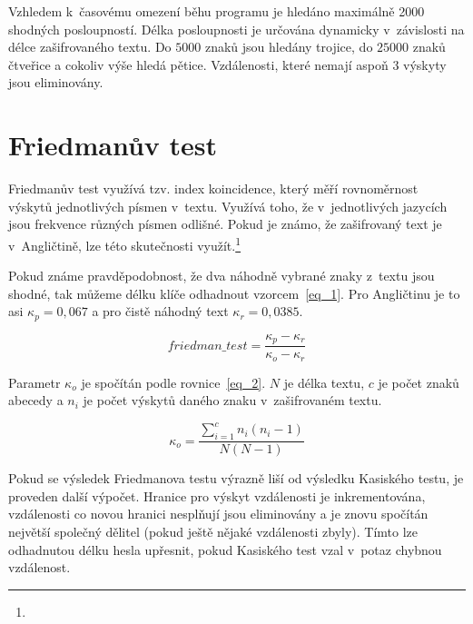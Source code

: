 \documentclass[11pt, a4paper, titlepage]{article}
\begin{document}
Vzhledem k~časovému omezení běhu programu je hledáno maximálně 2000 shodných posloupností.
Délka posloupnosti je určována dynamicky v~závislosti na délce zašifrovaného textu.
Do $5 000$ znaků jsou hledány trojice, do $25 000$ znaků čtveřice a cokoliv výše hledá pětice.
Vzdálenosti, které nemají aspoň $3$ výskyty jsou eliminovány.


\section{Friedmanův test}\label{sec_friedman}

Friedmanův test využívá tzv. index koincidence, který měří rovnoměrnost výskytů
jednotlivých písmen v~textu.
Využívá toho, že v~jednotlivých jazycích jsou frekvence různých písmen odlišné.
Pokud je známo, že zašifrovaný text je v~Angličtině, lze této skutečnosti
využít.\footnote{}

Pokud známe pravděpodobnost, že dva náhodně vybrané znaky z~textu jsou shodné,
tak můžeme délku klíče odhadnout vzorcem~\ref{eq_1}.
Pro Angličtinu je to asi $\kappa_{p} = 0,067$ a pro čistě náhodný text $\kappa_{r} = 0,0385$.

\begin{equation}
    friedman\_test = \frac{\kappa_{p} - \kappa_{r}}{\kappa_{o} - \kappa_{r}}
    \label{eq_1}
\end{equation}

Parametr $\kappa_{o}$ je spočítán podle rovnice~\ref{eq_2}.
$N$ je délka textu, $c$ je počet znaků abecedy a $n_i$ je počet výskytů
daného znaku v~zašifrovaném textu.

\begin{equation}
    \kappa_{o} = \frac{ \sum_{i=1}^c n_i (n_i - 1) }{N (N - 1)}
    \label{eq_2}
\end{equation}

Pokud se výsledek Friedmanova testu výrazně liší od výsledku Kasiského testu, je proveden další výpočet.
Hranice pro výskyt vzdálenosti je inkrementována, vzdálenosti co novou hranici nesplňují jsou eliminovány
a je znovu spočítán největší společný dělitel (pokud ještě nějaké vzdálenosti zbyly).
Tímto lze odhadnutou délku hesla upřesnit, pokud Kasiského test vzal v~potaz chybnou vzdálenost.

\end{document}
